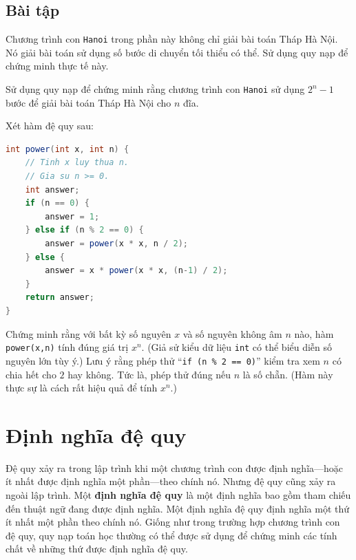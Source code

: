 \subsection*{Bài tập}
\begin{exercise}
Chương trình con \texttt{Hanoi} trong phần này không chỉ giải bài toán Tháp Hà Nội. Nó giải bài toán sử dụng số bước di chuyển tối thiểu có thể. Sử dụng quy nạp để chứng minh thực tế này.
\end{exercise}

\begin{exercise}
Sử dụng quy nạp để chứng minh rằng chương trình con \texttt{Hanoi} sử dụng $2^n - 1$ bước để giải bài toán Tháp Hà Nội cho $n$ đĩa.
\end{exercise}

\begin{exercise}
Xét hàm đệ quy sau:
\begin{lstlisting}[language=Java]
int power(int x, int n) {
    // Tinh x luy thua n.
    // Gia su n >= 0.
    int answer;
    if (n == 0) {
        answer = 1;
    } else if (n % 2 == 0) {
        answer = power(x * x, n / 2);
    } else {
        answer = x * power(x * x, (n-1) / 2);
    }
    return answer;
}
\end{lstlisting}
Chứng minh rằng với bất kỳ số nguyên $x$ và số nguyên không âm $n$ nào, hàm \texttt{power(x,n)} tính đúng giá trị $x^n$. (Giả sử kiểu dữ liệu \texttt{int} có thể biểu diễn số nguyên lớn tùy ý.) Lưu ý rằng phép thử ``\texttt{if (n \% 2 == 0)}'' kiểm tra xem $n$ có chia hết cho $2$ hay không. Tức là, phép thử đúng nếu $n$ là số chẵn. (Hàm này thực sự là cách rất hiệu quả để tính $x^n$.)
\end{exercise}

\section{Định nghĩa đệ quy}

Đệ quy xảy ra trong lập trình khi một chương trình con được định nghĩa---hoặc ít nhất được định nghĩa một phần---theo chính nó. Nhưng đệ quy cũng xảy ra ngoài lập trình. Một \textbf{định nghĩa đệ quy} là một định nghĩa bao gồm tham chiếu đến thuật ngữ đang được định nghĩa. Một định nghĩa đệ quy định nghĩa một thứ ít nhất một phần theo chính nó. Giống như trong trường hợp chương trình con đệ quy, quy nạp toán học thường có thể được sử dụng để chứng minh các tính chất về những thứ được định nghĩa đệ quy.

